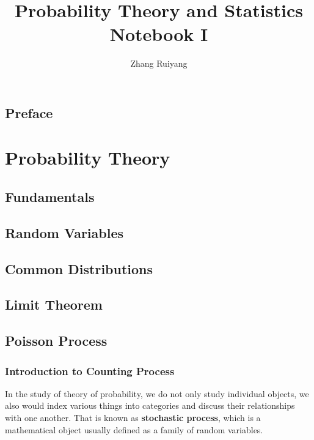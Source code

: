 \documentclass[11pt, a4paper, oneside]{book}
\theoremstyle{definition}
\begin{document}
\frontmatter 

\title{\huge Probability Theory and Statistics Notebook I}
\author{\Large{Zhang Ruiyang}}
\date{}
\maketitle

\tableofcontents

\newpage

\chapter*{Preface}

\mainmatter

\part{Probability Theory} 

\chapter{Fundamentals}
\chapter{Random Variables}
\chapter{Common Distributions}
\chapter{Limit Theorem}

\newpage


\chapter{Poisson Process}

\section{Introduction to Counting Process}

\noindent In the study of theory of probability, we do not only study individual objects, we also would index various things into categories and discuss their relationships with one another. That is known as \textbf{stochastic process}, which is a mathematical object usually defined as a family of random variables. 
\end{document}
